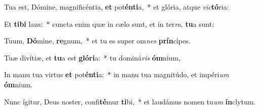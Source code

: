 \item Tua est, Dómine, magnificéntia, \textbf{et} pot\textbf{én}\textbf{ti}a,~* et glória, atque \textit{vic}\textbf{tó}ria:
\item Et \textbf{ti}\textbf{bi} laus:~* cuncta enim quæ in cælo sunt, et in ter\textit{ra}, \textbf{tu}a sunt:
\item Tuum, \textbf{Dó}mine, \textbf{re}gnum,~* et tu es super om\textit{nes} \textbf{prín}cipes.
\item Tuæ divítiæ, et \textbf{tu}a est \textbf{gló}\textbf{ri}a:~* tu dominá\textit{ris} \textbf{óm}nium,
\item In manu tua virtus \textbf{et} pot\textbf{én}\textbf{ti}a:~* in manu tua magnitúdo, et impéri\textit{um} \textbf{óm}nium.
\item Nunc ígitur, Deus noster, confi\textbf{té}mur \textbf{ti}bi,~* et laudámus nomen tu\textit{um} \textbf{ín}clytum.
